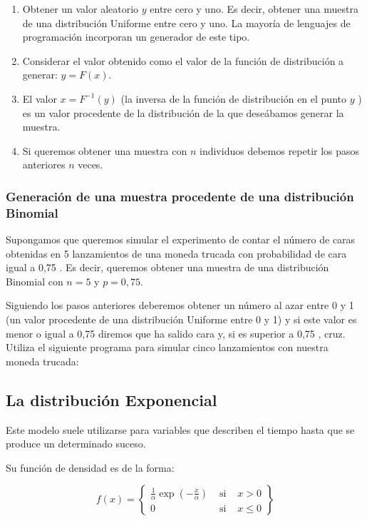 \documentclass[
  a4paper,
  DIV=11,
  numbers=noendperiod]{scrreprt}
\begin{document}
\begin{enumerate}
\def\labelenumi{\arabic{enumi}.}
\item
  Obtener un valor aleatorio \(y\) entre cero y uno. Es decir, obtener
  una muestra de una distribución Uniforme entre cero y uno. La mayoría
  de lenguajes de programación incorporan un generador de este tipo.
\item
  Considerar el valor obtenido como el valor de la función de
  distribución a generar: \(y=F(x)\).
\item
  El valor \(x=F^{-1}(y)\) (la inversa de la función de distribución en
  el punto \(y\) ) es un valor procedente de la distribución de la que
  deseábamos generar la muestra.
\item
  Si queremos obtener una muestra con \(n\) individuos debemos repetir
  los pasos anteriores \(n\) veces.
\end{enumerate}

\subsubsection{Generación de una muestra procedente de una distribución
Binomial}\label{generaciuxf3n-de-una-muestra-procedente-de-una-distribuciuxf3n-binomial}

Supongamos que queremos simular el experimento de contar el número de
caras obtenidas en 5 lanzamientos de una moneda trucada con probabilidad
de cara igual a 0,75 . Es decir, queremos obtener una muestra de una
distribución Binomial con \(n=5\) y \(p=0,75\).

Siguiendo los pasos anteriores deberemos obtener un número al azar entre
0 y 1 (un valor procedente de una distribución Uniforme entre 0 y 1) y
si este valor es menor o igual a 0,75 diremos que ha salido cara y, si
es superior a 0,75 , cruz. Utiliza el siguiente programa para simular
cinco lanzamientos con nuestra moneda trucada:

\subsection{La distribución
Exponencial}\label{la-distribuciuxf3n-exponencial}

Este modelo suele utilizarse para variables que describen el tiempo
hasta que se produce un determinado suceso.

Su función de densidad es de la forma:

\[
f(x)=\left\{\begin{array}{lll}
\frac{1}{\alpha} \exp \left(-\frac{x}{\alpha}\right) & \text { si } & x>0 \\
0 & \text { si } & x \leq 0
\end{array}\right\}
\]
\end{document}
